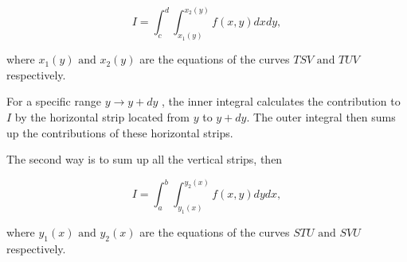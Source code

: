 \documentclass[english,a4paper,12pt]{report}
\begin{document}
\begin{equation}
    I = \int_{c}^{d} \int_{x_1 (y)}^{x_2 (y)} f(x,y) dx dy,   
\end{equation}

where \(x_1 (y) \text { and } x_2 (y)\) are the equations of the curves \(TSV \text { and } TUV\) respectively. 

For a specific range \(y \rightarrow y+dy\) , the inner integral calculates the contribution to \(I\) by the horizontal strip located from \(y\) to \(y+dy\). The outer integral then sums up the contributions of these horizontal strips.

The second way is to sum up all the vertical strips, then

\begin{equation}
    I = \int_{a}^{b} \int_{y_1 (x)}^{y_2 (x)} f(x,y) dy dx,
\end{equation}

where \(y_1 (x) \text { and } y_2 (x)\) are the equations of the curves \(STU \text { and } SVU\) respectively.   
\end{document}
